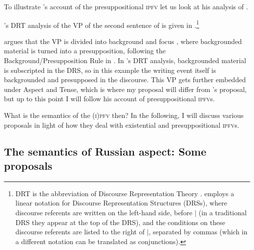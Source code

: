 \documentclass[output=paper]{langscibook}
\begin{document}
To illustrate \citeauthor{gronndiss}'s account of the presuppositional \textsc{ipfv} let us look at his analysis of  \citep[attributed to][]{forsyth70}.

\label{gehr:ex:loveletter}
\z 

\noindent \citeauthor{gronndiss}'s DRT analysis of the VP of the second sentence of  is given in .\footnote{DRT is the abbreviation of Discourse Representation Theory \citep[see][]{kampreyle}. \citeauthor{gronndiss} employs a linear notation for Discourse Representation Structures (DRSs), where discourse referents are written on the left-hand side, before $|$ (in a traditional DRS they appear at the top of the DRS), and the conditions on these discourse referents are listed to the right of $|$, separated by commas (which in a different notation can be translated as conjunctions).\label{gehr:fn:DRT}}

\label{gehr:ex:gronnanalysis}
\z 

\noindent \citeauthor{gronndiss} argues that the VP is divided into background and focus \citep[following][]{krifka01}, where backgrounded material is turned into a presupposition, following the Background/Presupposition Rule in \citet{geurtssandt97}. In \citeauthor{gronndiss}'s DRT analysis, backgrounded material is subscripted in the DRS, so in this example the writing event itself is backgrounded and presupposed in the discourse. This VP gets further embedded under Aspect and Tense, which is where my proposal will differ from \citeauthor{gronndiss}'s proposal, but up to this point I will follow his account of presuppositional \textsc{ipfv}s. 

What is the semantics of the \textsc{(i)pfv} then? In the following, I will discuss various proposals in light of how they deal with existential and presuppositional \textsc{ipfv}s. 

\subsection{The semantics of Russian aspect: Some proposals}
\label{gehr:sec:prev}
\end{document}

